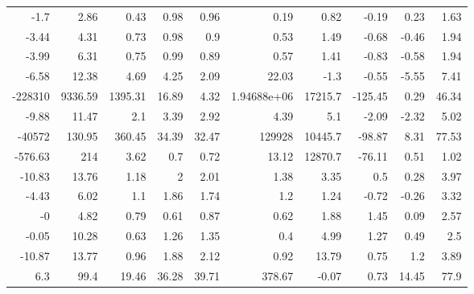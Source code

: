 \begin{tabular}{rrrrrrrrrr}
      -1.7  &    2.86 &    0.43 &     0.98 &   0.96 &      0.19        &              0.82 &             -0.19 &           0.23 &            1.63 \\
      -3.44 &    4.31 &    0.73 &     0.98 &   0.9  &      0.53        &              1.49 &             -0.68 &          -0.46 &            1.94 \\
      -3.99 &    6.31 &    0.75 &     0.99 &   0.89 &      0.57        &              1.41 &             -0.83 &          -0.58 &            1.94 \\
      -6.58 &   12.38 &    4.69 &     4.25 &   2.09 &     22.03        &             -1.3  &             -0.55 &          -5.55 &            7.41 \\
 -228310    & 9336.59 & 1395.31 &    16.89 &   4.32 &      1.94688e+06 &          17215.7  &           -125.45 &           0.29 &           46.34 \\
      -9.88 &   11.47 &    2.1  &     3.39 &   2.92 &      4.39        &              5.1  &             -2.09 &          -2.32 &            5.02 \\
  -40572    &  130.95 &  360.45 &    34.39 &  32.47 & 129928           &          10445.7  &            -98.87 &           8.31 &           77.53 \\
    -576.63 &  214    &    3.62 &     0.7  &   0.72 &     13.12        &          12870.7  &            -76.11 &           0.51 &            1.02 \\
     -10.83 &   13.76 &    1.18 &     2    &   2.01 &      1.38        &              3.35 &              0.5  &           0.28 &            3.97 \\
      -4.43 &    6.02 &    1.1  &     1.86 &   1.74 &      1.2         &              1.24 &             -0.72 &          -0.26 &            3.32 \\
      -0    &    4.82 &    0.79 &     0.61 &   0.87 &      0.62        &              1.88 &              1.45 &           0.09 &            2.57 \\
      -0.05 &   10.28 &    0.63 &     1.26 &   1.35 &      0.4         &              4.99 &              1.27 &           0.49 &            2.5  \\
     -10.87 &   13.77 &    0.96 &     1.88 &   2.12 &      0.92        &             13.79 &              0.75 &           1.2  &            3.89 \\
       6.3  &   99.4  &   19.46 &    36.28 &  39.71 &    378.67        &             -0.07 &              0.73 &          14.45 &           77.9  \\

\end{tabular}
